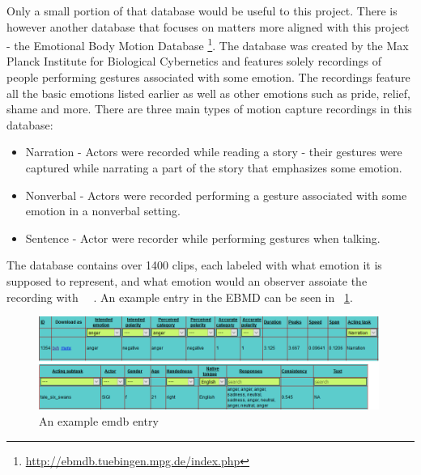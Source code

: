 Only a small portion of that database would be useful to this project. There is however another database that focuses on matters more aligned with this project - the Emotional Body Motion Database \footnote{\url{http://ebmdb.tuebingen.mpg.de/index.php}}. The database was created by the Max Planck Institute for Biological Cybernetics and features solely recordings of people performing gestures associated with some emotion. The recordings feature all the basic emotions listed earlier as well as other emotions such as pride, relief, shame and more. There are three main types of motion capture recordings in this database:
\begin{itemize}
\item Narration - Actors were recorded while reading a story - their gestures were captured while narrating a part of the story that emphasizes some emotion.
\item Nonverbal - Actors were recorded performing a gesture associated with some emotion in a nonverbal setting.
\item Sentence - Actor were recorder while performing gestures when talking.
\end{itemize}
The database contains over 1400 clips, each labeled with what emotion it is supposed to represent, and what emotion would an observer assoiate the recording with ~\cite{planck1}~\cite{planck2}. An example entry in the EBMD can be seen in ~\ref{fig:ebmd1}.

\begin{figure}[!ht]
\centerline{\includegraphics[width = 30em]{img/emo1.png}}
\caption{An example emdb entry}\label{fig:ebmd1}
\end{figure}

